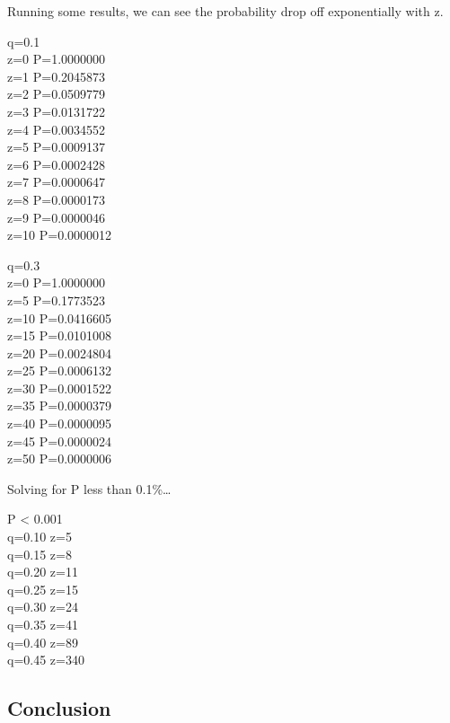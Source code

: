 Running some results, we can see the probability drop off exponentially
with z.

q=0.1\\
z=0 P=1.0000000\\
z=1 P=0.2045873\\
z=2 P=0.0509779\\
z=3 P=0.0131722\\
z=4 P=0.0034552\\
z=5 P=0.0009137\\
z=6 P=0.0002428\\
z=7 P=0.0000647\\
z=8 P=0.0000173\\
z=9 P=0.0000046\\
z=10 P=0.0000012

q=0.3\\
z=0 P=1.0000000\\
z=5 P=0.1773523\\
z=10 P=0.0416605\\
z=15 P=0.0101008\\
z=20 P=0.0024804\\
z=25 P=0.0006132\\
z=30 P=0.0001522\\
z=35 P=0.0000379\\
z=40 P=0.0000095\\
z=45 P=0.0000024\\
z=50 P=0.0000006

Solving for P less than 0.1\%\ldots{}

P \textless{} 0.001\\
q=0.10 z=5\\
q=0.15 z=8\\
q=0.20 z=11\\
q=0.25 z=15\\
q=0.30 z=24\\
q=0.35 z=41\\
q=0.40 z=89\\
q=0.45 z=340

\subsection{Conclusion}\label{conclusion}

